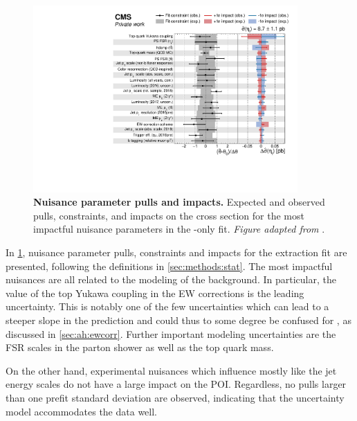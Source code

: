\begin{figure}[th]
    \centering
    \includegraphics[width=0.9\textwidth]{figures/ah/etatfit/impacts_nonps.pdf}
    \caption{
        \textbf{Nuisance parameter pulls and impacts.} Expected and observed pulls, constraints, and impacts on the \etat cross section for the most impactful nuisance parameters in the \etat-only fit. \textit{Figure adapted from }.
    }
    \label{fig:ah:impacts_etat}
\end{figure}

In \cref{fig:ah:impacts_etat}, nuisance parameter pulls, constraints and impacts for the \etat extraction fit are presented, following the definitions in \cref{sec:methods:stat}. The most impactful nuisances are all related to the modeling of the \ttbar background. In particular, %
the value of the top Yukawa coupling \yt in the EW corrections is the leading uncertainty. This is notably one of the few uncertainties which can lead to a steeper \chel slope in the \ttbar prediction and could thus to some degree be confused for \etat, as discussed in \cref{sec:ah:ewcorr}. Further important modeling uncertainties are the FSR scales in the \ttbar parton shower as well as the top quark mass. 

On the other hand, experimental nuisances which influence mostly \mtt like the jet energy scales do not have a large impact on the POI. Regardless, no pulls larger than one prefit standard deviation are observed, indicating that the uncertainty model accommodates the data well.

